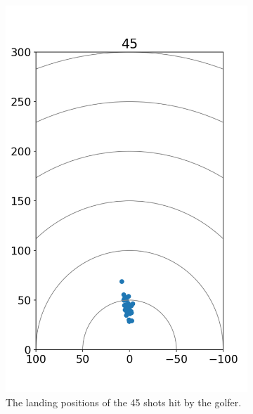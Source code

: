 \documentclass{kththesis}
\begin{document}
\begin{figure}
\begin{subfigure}{0.4\textwidth}
    \includegraphics[height=0.4\textheight]{Shots/45_shots.png} 
    \caption{The landing positions of the 45 shots hit by the golfer.}
    \label{fig:45_shots}
    \end{subfigure}
    \begin{subfigure}{0.4\textwidth}
    \centering

\end{subfigure}
\end{figure}
\end{document}
